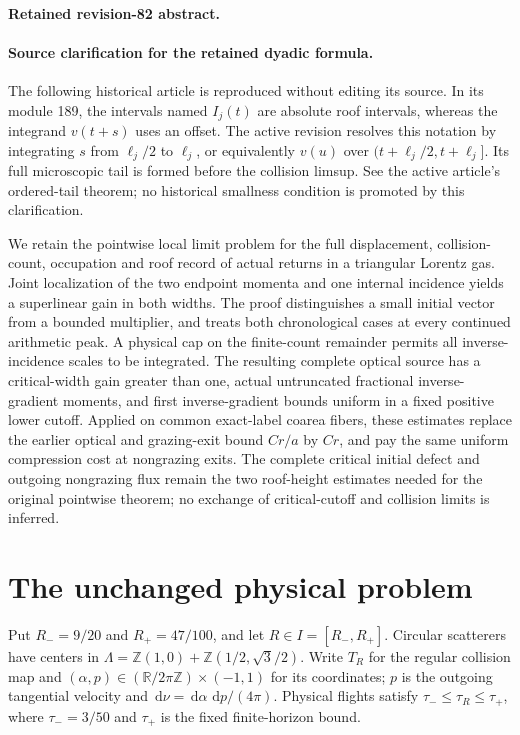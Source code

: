 \documentclass[11pt,reqno]{amsart}
\numberwithin{equation}{section}
\theoremstyle{definition}\newtheorem{definition}[theorem]{Definition}
\theoremstyle{remark}\newtheorem{remark}[theorem]{Remark}
\newcommand{\R}{\mathbb R}\newcommand{\Z}{\mathbb Z}\newcommand{\T}{\mathbb T}
\newcommand{\dd}{\,\mathrm d}\newcommand{\one}{\mathbf1}
\theoremstyle{definition}\newtheorem{inputstatement}[theorem]{Input statement}
\begin{document}
\paragraph{Retained revision-82 abstract.}
\paragraph{Source clarification for the retained dyadic formula.}
The following historical article is reproduced without editing its source.
In its module 189, the intervals named $I_j(t)$ are absolute roof intervals,
whereas the integrand $v(t+s)$ uses an offset. The active revision resolves
this notation by integrating $s$ from $\ell_j/2$ to $\ell_j$, or equivalently
$v(u)$ over $(t+\ell_j/2,t+\ell_j]$. Its full microscopic tail is formed
before the collision limsup. See the active article's ordered-tail theorem;
no historical smallness condition is promoted by this clarification.

We retain the pointwise local limit problem for the full displacement,
collision-count, occupation and roof record of actual returns in a
triangular Lorentz gas. Joint localization of the two endpoint momenta
and one internal incidence yields a superlinear gain in both widths.
The proof distinguishes a small initial vector from a bounded
multiplier, and treats both chronological cases at every continued
arithmetic peak. A physical cap on the finite-count remainder permits
all inverse-incidence scales to be integrated. The resulting complete
optical source has a critical-width gain greater than one, actual
untruncated fractional inverse-gradient moments, and first
inverse-gradient bounds uniform in a fixed positive lower cutoff.
Applied on common exact-label coarea fibers, these estimates replace
the earlier optical and grazing-exit bound $Cr/a$ by $Cr$, and pay
the same uniform compression cost at nongrazing exits. The complete
critical initial defect and outgoing nongrazing flux remain the two
roof-height estimates needed for the original pointwise theorem;
no exchange of critical-cutoff and collision limits is inferred.



\section{The unchanged physical problem}
Put $R_-=9/20$ and $R_+=47/100$, and let $R\in I=[R_-,R_+]$. Circular scatterers have centers in
$\Lambda=\Z(1,0)+\Z(1/2,\sqrt3/2)$. Write $T_R$ for the regular
collision map and $(\alpha,p)\in(\R/2\pi\Z)\times(-1,1)$ for its
coordinates; $p$ is the outgoing tangential velocity and
$\dd\nu=\dd\alpha\,\dd p/(4\pi)$. Physical flights satisfy
$\tau_-\le\tau_R\le\tau_+$, where $\tau_-=3/50$ and $\tau_+$
is the fixed finite-horizon bound.
\end{document}
